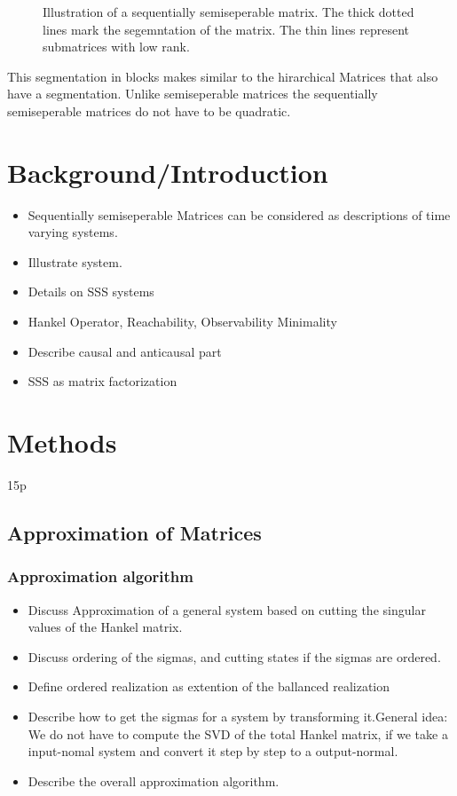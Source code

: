 \documentclass[doctype=mastersthesis,BCOR=15mm,biblatex]{ldvbook}%
\begin{document}
\begin{figure}
	\centering
	
	\caption{Illustration of a sequentially semiseperable matrix. The thick dotted lines mark the segemntation of the matrix. The thin lines represent submatrices with low rank.}
	\label{fig:sequentiallysep}
\end{figure}

This segmentation in blocks makes similar to the hirarchical Matrices that also have a segmentation.
Unlike semiseperable matrices the sequentially semiseperable matrices do not have to be quadratic. 

\chapter{Background/Introduction}\label{chap:background}
\begin{itemize}
	\item Sequentially semiseperable Matrices can be considered as descriptions of time varying systems.
	\item Illustrate system.
	
	\item Details on SSS systems
	
	\item Hankel Operator, Reachability, Observability Minimality
	\item Describe causal and anticausal part
	
	\item SSS as matrix factorization
\end{itemize}



\chapter{Methods} 15p

\section{Approximation of Matrices}
\subsection{Approximation algorithm}
\begin{itemize}
\item Discuss Approximation of a general system based on cutting the singular values of the Hankel matrix.

\item Discuss ordering of the sigmas, and cutting states if the sigmas are ordered.
\item Define ordered realization as extention of the ballanced realization

\item Describe how to get the sigmas for a system by transforming it.General idea: We do not have to compute the SVD of the total Hankel matrix, if we take a input-nomal system and convert it step by step to a output-normal.

\item Describe the overall approximation algorithm.
\end{itemize}
\end{document}
